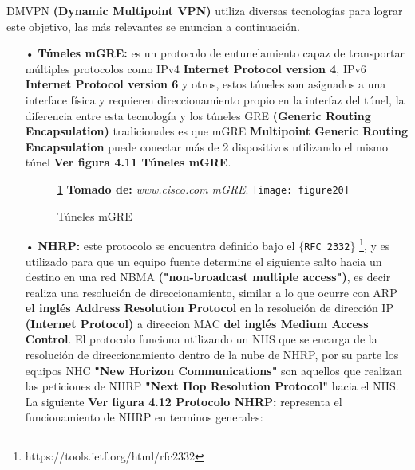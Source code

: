 DMVPN \textbf{(Dynamic Multipoint VPN)} utiliza diversas tecnologías para lograr este objetivo, las más relevantes se enuncian a continuación.
\begin{itemize}
\item[•]\textbf{Túneles mGRE:} es un protocolo de entunelamiento capaz de transportar múltiples protocolos como IPv4 \textbf{Internet Protocol version 4}, IPv6 \textbf{Internet Protocol version 6} y otros, estos túneles son asignados a una interface física y requieren direccionamiento propio en la interfaz del túnel, la diferencia entre esta tecnología y los túneles GRE \textbf{(Generic Routing Encapsulation)} tradicionales es que mGRE \textbf{Multipoint Generic Routing Encapsulation} puede conectar más de 2 dispositivos utilizando el mismo túnel \textbf{Ver figura 4.11 Túneles mGRE}.
\begin{figure}[htbp]
\ref{fig:mgre} \textbf{Tomado de:} \textit{www.cisco.com mGRE}.
  \centering
    {\texttt{[image: figure20]}}%
  \caption{Túneles mGRE}
  \label{fig:mgre}
\end{figure}
\item[•]\textbf{NHRP:} este protocolo se encuentra definido bajo el \texttt{$\{$RFC 2332$\}$} 
\footnote{https://tools.ietf.org/html/rfc2332}, y es utilizado para que un equipo fuente determine el siguiente salto hacia un destino en una red NBMA \textbf{("non-broadcast multiple access")}, es decir realiza una resolución de direccionamiento, similar a lo que ocurre con ARP \textbf{el inglés Address Resolution Protocol} en la resolución de dirección IP \textbf{(Internet Protocol)} a direccion MAC \textbf{del inglés Medium Access Control}. El protocolo funciona utilizando un NHS  que se encarga de la resolución de direccionamiento dentro de la nube de NHRP, por su parte los equipos NHC \textbf{"New Horizon Communications"} son aquellos que realizan las peticiones de NHRP \textbf{"Next Hop Resolution Protocol"} hacia el NHS. La siguiente \textbf{Ver figura 4.12 Protocolo NHRP:} representa el funcionamiento de NHRP en terminos generales:


\end{itemize}
